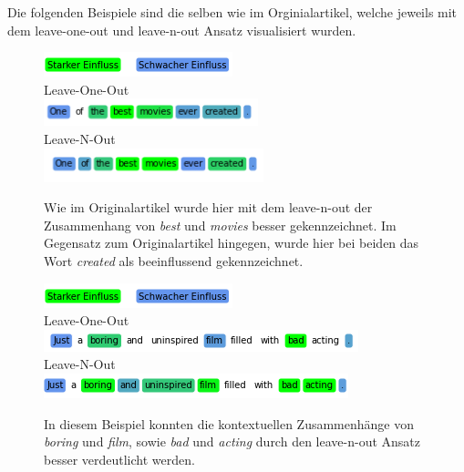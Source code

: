 \documentclass[DIV=13,fontsize=11pt]{scrartcl}
\begin{document}
Die folgenden Beispiele sind die selben wie im Orginialartikel, welche
jeweils mit dem leave-one-out und leave-n-out Ansatz visualisiert wurden.

\begin{figure}[H]
    \centering
    \includegraphics[]{img/legend.png}\\
    Leave-One-Out\\
    \includegraphics[]{img/first_ex_loo.png}\\
    Leave-N-Out\\
    \includegraphics[]{img/first_ex_lno.png}
    \caption{Wie im Originalartikel wurde hier mit dem leave-n-out der Zusammenhang von \textit{best} und \textit{movies} besser gekennzeichnet. Im Gegensatz zum Originalartikel hingegen, wurde hier bei beiden das Wort \textit{created} als beeinflussend gekennzeichnet.}
    \label{fig:ex1}
\end{figure}

\begin{figure}[H]
    \centering
    \includegraphics[]{img/legend.png}\\
    Leave-One-Out\\
    \includegraphics[]{img/sec_ex_loo.png}\\
    Leave-N-Out\\
    \includegraphics[]{img/sec_ex_lno.png}
    \caption{In diesem Beispiel konnten die kontextuellen Zusammenhänge von \textit{boring} und \textit{film}, sowie \textit{bad} und \textit{acting} durch den leave-n-out Ansatz besser verdeutlicht werden.}
    \label{fig:ex2}
\end{figure}
\end{document}
